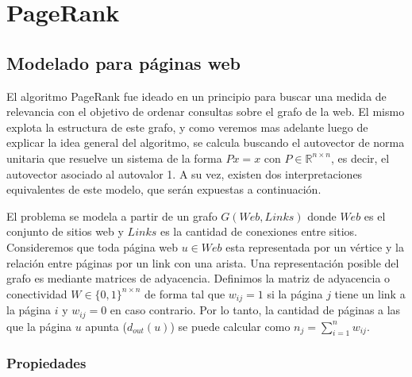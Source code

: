 \section{PageRank}

\subsection{Modelado para páginas web}

El algoritmo PageRank fue ideado en un principio para buscar una medida de relevancia con el objetivo de ordenar consultas sobre el grafo de la web. El mismo explota la estructura de este grafo, y como veremos mas adelante luego de explicar la idea general del algoritmo, se calcula buscando el autovector de norma unitaria que resuelve un sistema de la forma $Px = x$ con $P\in \mathbb{R}^{n \times n}$, es decir, el autovector asociado al autovalor 1. A su vez, existen dos interpretaciones equivalentes de este modelo, que serán expuestas a continuación.

El problema se modela a partir de un grafo $G(Web,Links)$ donde $Web$ es el conjunto de sitios web y $Links$ es la cantidad de conexiones entre sitios. Consideremos que toda página web $u \in Web$ esta representada por un vértice y la relación entre páginas por un link con una arista. Una representación posible del grafo es mediante matrices de adyacencia. Definimos la matriz de adyacencia o conectividad $W \in \{0,1\}^{n \times n}$ de forma tal que $w_{ij} = 1$ si la página $j$ tiene un link a la página $i$ y $w_{ij} = 0$ en caso contrario. Por lo tanto, la cantidad de páginas a las que la página $u$ apunta ($d_{out}(u)$) se puede calcular como $n_j = \sum_{i=1}^{n} w_{ij}$.

\subsubsection{Propiedades}

